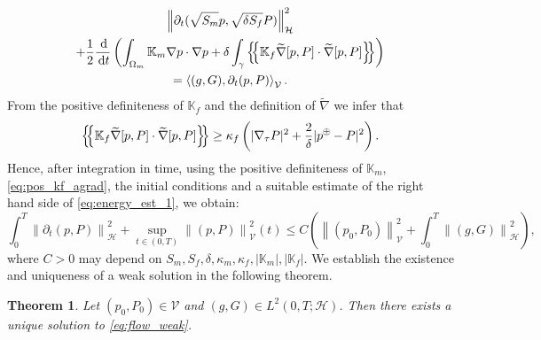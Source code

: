 \documentclass[a4paper]{article}
\newtheorem{theorem}{Theorem}
\def\agrad{\widetilde\nabla}
\def\avg#1{\left\{\mskip-5mu\left\{#1\right\}\mskip-5mu\right\}}
\def\d {\,{\rm d}}
\def\ddt#1{\frac{\d #1}{\d t}}
\def\dt{\prtl_t}
\def\dual#1#2{\left\langle #1,#2\right\rangle}
\def\Hf{\mathcal H}
\def\norm#1{\left\|#1\right\|}
\def\prtl{\partial}
\def\tn#1{{\mathbb{#1}}}    %
\def\Vf{{\mathcal V}} %
\newcommand{\eq}[1]{\begin{equation}#1\end{equation}}
\newcommand{\ml}[1]{\begin{multline}#1\end{multline}}
\newcommand{\opm}{ %
  {\mathbin{
    \mathchoice
      {\buildcirclepm{\displaystyle     }{0.14ex}{0.95}{0.05ex}{.7}}
      {\buildcirclepm{\textstyle        }{0.14ex}{0.95}{0.05ex}{.7}}
      {\buildcirclepm{\scriptstyle      }{0.13ex}{0.955}{0.04ex}{.55}}
      {\buildcirclepm{\scriptscriptstyle}{0.08ex}{0.95}{0.03ex}{.45}}
  }} 
}
\newcommand\buildcirclepm[5]{%
  \begin{tikzpicture}[baseline=(X.base), inner sep=-#5, outer sep=-.65]
    \node[draw,circle,line width=#4] (X)  {\footnotesize\raisebox{#2}{\scalebox{#3}{$#1\pm$}}};
  \end{tikzpicture}%
}
\begin{document}
\ml{\label{eq:energy_est_1} \norm{\dt(\sqrt{S_m} p,\sqrt{\delta S_f} P)}_\Hf^2\\
+ \frac12\ddt{}\left(\int_{\Omega_m}\tn K_m\nabla p\cdot\nabla p
+ \delta\int_\gamma\avg{\tn K_f\agrad[p,P]\cdot\agrad[p,P]}\right)\\
= \dual{(g,G)}{\dt(p,P)}_\Vf. }
From the positive definiteness of $\tn K_f$ and the definition of $\agrad$ we infer that
\eq{ \label{eq:pos_kf_agrad} \avg{\tn K_f\agrad[p,P]\cdot\agrad[p,P]} \ge \kappa_f\left(|\nabla_\tau P|^2 + \frac2\delta|p^\opm-P|^2\right). }
Hence, after integration in time, using the positive definiteness of $\tn K_m$, \eqref{eq:pos_kf_agrad}, the initial conditions and a suitable estimate of the right hand side of \eqref{eq:energy_est_1}, we obtain:
\eq{ \label{eq:energy_est_flow} \int_0^T\norm{\dt(p,P)}_\Hf^2 + \sup_{t\in(0,T)}\norm{(p,P)}_\Vf^2(t) \le C\left(\norm{(p_0,P_0)}_\Vf^2 + \int_0^T\norm{(g,G)}_{\Hf}^2\right), }
where $C>0$ may depend on $S_m,S_f,\delta,\kappa_m,\kappa_f,|\tn K_m|,|\tn K_f|$.
% 
We establish the existence and uniqueness of a weak solution in the following theorem.
% 
\begin{theorem}
Let $(p_0,P_0)\in\Vf$ and $(g,G)\in L^2(0,T;\Hf)$.
Then there exists a unique solution to \eqref{eq:flow_weak}.
\end{theorem}
\end{document}
